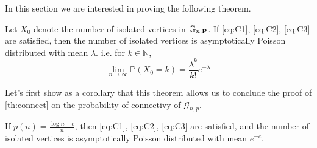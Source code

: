 In this section we are interested in proving the following theorem.
\begin{theorem}\label{th:CVIsolPoi}
	Let $X_0$ denote the number of isolated vertices in $\mathbb{G}_{n, \bold{P}}$. If \eqref{eq:C1}, \eqref{eq:C2}, \eqref{eq:C3} are satisfied, 
	then the number of isolated vertices is asymptotically Poisson distributed with mean $\lambda$.
	\newline
	i.e. for $k \in \mathbb{N}$, 
	\begin{equation}
		\lim_{n \to \infty} \mathbb{P}(X_0 = k) = \frac{\lambda^k}{k!}e^{-\lambda}
	\end{equation}
\end{theorem}
Let's first show as a corollary that this theorem allows us to conclude the proof of \ref{th:connect} on the probability of connectivy of $\mathcal{G}_{n,p}$.
\begin{corollary}\label{th:proofPoissonP}
	If $p(n) = \frac{\log n + c}{n}$, then \eqref{eq:C1}, \eqref{eq:C2}, \eqref{eq:C3} are satisfied, 
	and the number of isolated vertices is asymptotically Poisson distributed with mean $e^{-c}$.
\end{corollary}

